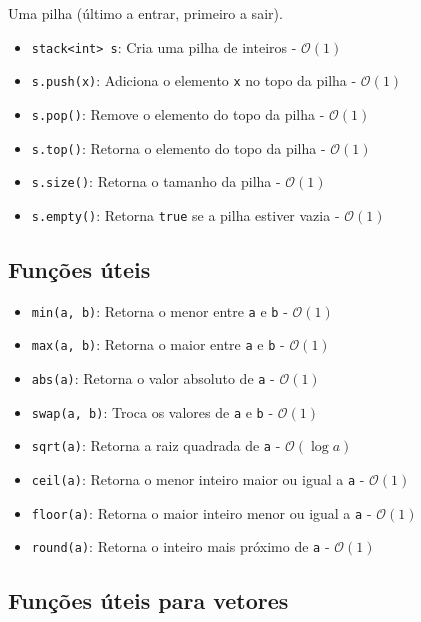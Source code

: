 Uma pilha (último a entrar, primeiro a sair).

\begin{itemize}
    \item \texttt{stack<int> s}: Cria uma pilha de inteiros - $\mathcal{O}(1)$
    \item \texttt{s.push(x)}: Adiciona o elemento \texttt{x} no topo da pilha - $\mathcal{O}(1)$
    \item \texttt{s.pop()}: Remove o elemento do topo da pilha - $\mathcal{O}(1)$
    \item \texttt{s.top()}: Retorna o elemento do topo da pilha - $\mathcal{O}(1)$
    \item \texttt{s.size()}: Retorna o tamanho da pilha - $\mathcal{O}(1)$
    \item \texttt{s.empty()}: Retorna \texttt{true} se a pilha estiver vazia - $\mathcal{O}(1)$
\end{itemize}

\subsection{Funções úteis}

\begin{itemize}
    \item \texttt{min(a, b)}: Retorna o menor entre \texttt{a} e \texttt{b} - $\mathcal{O}(1)$
    \item \texttt{max(a, b)}: Retorna o maior entre \texttt{a} e \texttt{b} - $\mathcal{O}(1)$
    \item \texttt{abs(a)}: Retorna o valor absoluto de \texttt{a} - $\mathcal{O}(1)$
    \item \texttt{swap(a, b)}: Troca os valores de \texttt{a} e \texttt{b} - $\mathcal{O}(1)$
    \item \texttt{sqrt(a)}: Retorna a raiz quadrada de \texttt{a} - $\mathcal{O}(\log a)$
    \item \texttt{ceil(a)}: Retorna o menor inteiro maior ou igual a \texttt{a} - $\mathcal{O}(1)$
    \item \texttt{floor(a)}: Retorna o maior inteiro menor ou igual a \texttt{a} - $\mathcal{O}(1)$
    \item \texttt{round(a)}: Retorna o inteiro mais próximo de \texttt{a} - $\mathcal{O}(1)$
\end{itemize}

\subsection{Funções úteis para vetores}

